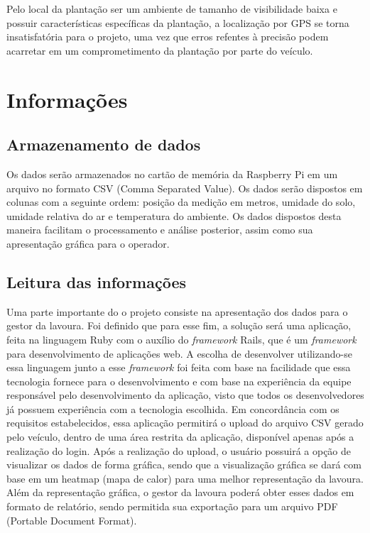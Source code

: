 Pelo local da plantação ser um ambiente de tamanho de visibilidade baixa e possuir características específicas da plantação, a localização por GPS se torna insatisfatória para o projeto, uma vez que erros refentes à precisão podem acarretar em um comprometimento da plantação por parte do veículo.

 \section{Informações}
   \subsection{Armazenamento de dados}
Os dados serão armazenados no cartão de memória da Raspberry Pi em um arquivo no formato CSV (Comma Separated Value). Os dados serão dispostos em colunas com a seguinte ordem: posição da medição em metros, umidade do solo, umidade relativa do ar e temperatura do ambiente.
Os dados dispostos desta maneira facilitam o processamento e análise posterior, assim como sua apresentação gráfica para o operador.
   \subsection{Leitura das informações}

Uma parte importante do o projeto consiste na apresentação dos dados para o gestor da lavoura. Foi definido que para esse fim, a solução será uma aplicação, feita na linguagem Ruby com o auxílio do \textit{framework} Rails, que é um \textit{framework} para desenvolvimento de aplicações web.
A escolha de desenvolver utilizando-se essa linguagem junto a esse \textit{framework} foi feita com base na facilidade que essa tecnologia fornece para o desenvolvimento e com base na experiência da equipe responsável pelo desenvolvimento da aplicação, visto que todos os desenvolvedores já possuem experiência com a tecnologia escolhida.
Em concordância com os requisitos estabelecidos, essa aplicação permitirá o upload do arquivo CSV gerado pelo veículo, dentro de uma área restrita da aplicação, disponível apenas após a realização do login.
Após a realização do upload, o usuário possuirá a opção de visualizar os dados de forma gráfica, sendo que a visualização gráfica se dará com base em um heatmap (mapa de calor) para uma melhor representação da lavoura.
Além da representação gráfica, o gestor da lavoura poderá obter esses dados em formato de relatório, sendo permitida sua exportação para um arquivo PDF (Portable Document Format).
